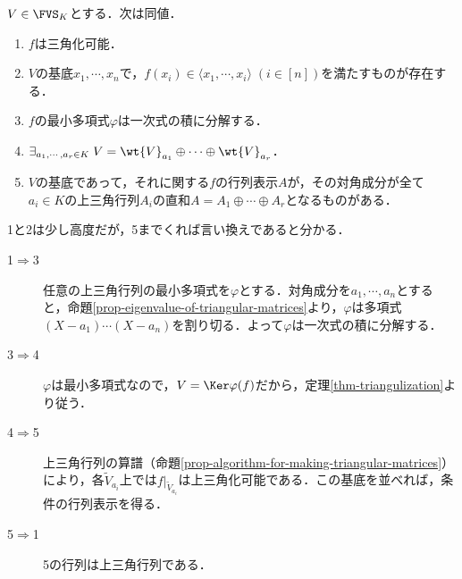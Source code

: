 \documentclass[uplatex, dvipdfmx]{jsreport}
\begin{document}
\begin{corollary}[三角化可能条件]\label{cor-triangulability}
    $V\in\FVS_K$とする．次は同値．
    \begin{enumerate}
        \item $f$は三角化可能．
        \item $V$の基底$x_1,\cdots,x_n$で，$f(x_i)\in\langle x_1,\cdots,x_i\rangle\;(i\in[n])$を満たすものが存在する．
        \item $f$の最小多項式$\varphi$は一次式の積に分解する．
        \item $\exists_{a_1,\cdots,a_r\in K}\;V=\wt{V}_{a_1}\oplus\cdots\oplus\wt{V}_{a_r}$．
        \item $V$の基底であって，それに関する$f$の行列表示$A$が，その対角成分が全て$a_i\in K$の上三角行列$A_i$の直和$A=A_1\oplus\cdots\oplus A_r$となるものがある．
    \end{enumerate}
\end{corollary}
\begin{Proof}
    1と2は少し高度だが，5までくれば言い換えであると分かる．
    \begin{description}
        \item[1$\Rightarrow$3] 任意の上三角行列の最小多項式を$\varphi$とする．対角成分を$a_1,\cdots,a_n$とすると，命題\ref{prop-eigenvalue-of-triangular-matrices}より，$\varphi$は多項式$(X-a_1)\cdots(X-a_n)$を割り切る．よって$\varphi$は一次式の積に分解する．
        \item[3$\Rightarrow$4] $\varphi$は最小多項式なので，$V=\Ker\varphi(f)$だから，定理\ref{thm-triangulization}より従う．
        \item[4$\Rightarrow$5] 上三角行列の算譜（命題\ref{prop-algorithm-for-making-triangular-matrices}）により，各$\tilde{V}_{a_i}$上では$f|_{\tilde{V}_{a_i}}$は上三角化可能である．この基底を並べれば，条件の行列表示を得る．
        
        \item[5$\Rightarrow$1] 5の行列は上三角行列である．
    \end{description}
\end{Proof}
\end{document}
